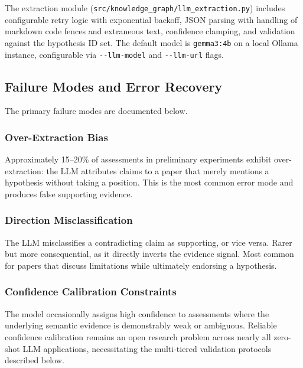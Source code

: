 \documentclass[
]{article}
\begin{document}
The extraction module (\texttt{src/knowledge\_graph/llm\_extraction.py})
includes configurable retry logic with exponential backoff, JSON parsing
with handling of markdown code fences and extraneous text, confidence
clamping, and validation against the hypothesis ID set. The default
model is \texttt{gemma3:4b} on a local Ollama instance, configurable via
\texttt{-\/-llm-model} and \texttt{-\/-llm-url} flags.

\subsection{Failure Modes and Error
Recovery}\label{failure-modes-and-error-recovery}

The primary failure modes are documented below.

\subsubsection{Over-Extraction Bias}\label{over-extraction-bias}

Approximately 15--20\% of assessments in preliminary experiments exhibit
over-extraction: the LLM attributes claims to a paper that merely
mentions a hypothesis without taking a position. This is the most common
error mode and produces false supporting evidence.

\subsubsection{Direction
Misclassification}\label{direction-misclassification}

The LLM misclassifies a contradicting claim as supporting, or vice
versa. Rarer but more consequential, as it directly inverts the evidence
signal. Most common for papers that discuss limitations while ultimately
endorsing a hypothesis.

\subsubsection{Confidence Calibration
Constraints}\label{confidence-calibration-constraints}

The model occasionally assigns high confidence to assessments where the
underlying semantic evidence is demonstrably weak or ambiguous. Reliable
confidence calibration remains an open research problem across nearly
all zero-shot LLM applications, necessitating the multi-tiered
validation protocols described below.
\end{document}
